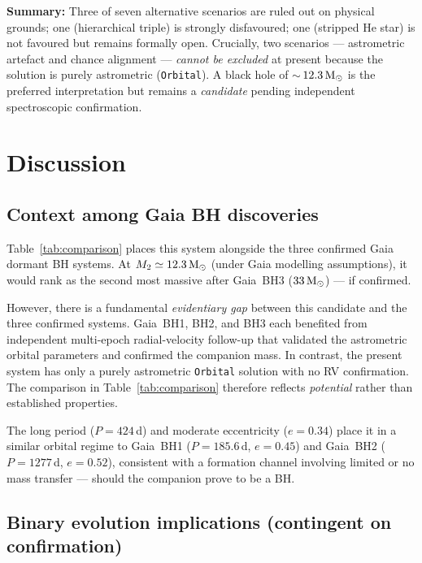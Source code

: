 \documentclass[usenatbib,fleqn]{mnras}
\newcommand{\Msun}{{\rm M}_\odot}
\begin{document}
\medskip\noindent
\textbf{Summary:} Three of seven alternative scenarios are ruled
out on physical grounds; one (hierarchical triple) is strongly
disfavoured; one (stripped He star) is not favoured but remains
formally open.  Crucially, two scenarios --- astrometric artefact
and chance alignment --- \emph{cannot be excluded} at present
because the solution is purely astrometric (\texttt{Orbital}).
A black hole of $\sim$\,$12.3\,\Msun$ is the preferred
interpretation but remains a \emph{candidate} pending independent
spectroscopic confirmation.

\section{Discussion}
\label{sec:discussion}

\subsection{Context among Gaia BH discoveries}

Table~\ref{tab:comparison} places this system alongside the three
confirmed Gaia dormant BH systems.  At $M_2 \simeq 12.3\,\Msun$
(under Gaia modelling assumptions), it would rank as the second most
massive after Gaia~BH3 ($33\,\Msun$) --- if confirmed.

However, there is a fundamental \emph{evidentiary gap} between this
candidate and the three confirmed systems.  Gaia~BH1, BH2, and BH3
each benefited from independent multi-epoch radial-velocity follow-up
that validated the astrometric orbital parameters and confirmed the
companion mass.  In contrast, the present system has only a purely
astrometric \texttt{Orbital} solution with no RV confirmation.  The
comparison in Table~\ref{tab:comparison} therefore reflects
\emph{potential} rather than established properties.

The long period ($P = 424$\,d) and moderate eccentricity
($e = 0.34$) place it in a similar orbital regime to Gaia~BH1
($P = 185.6$\,d, $e = 0.45$) and Gaia~BH2 ($P = 1277$\,d,
$e = 0.52$), consistent with a formation channel involving limited
or no mass transfer --- should the companion prove to be a BH.

\subsection{Binary evolution implications (contingent on confirmation)}
\end{document}
